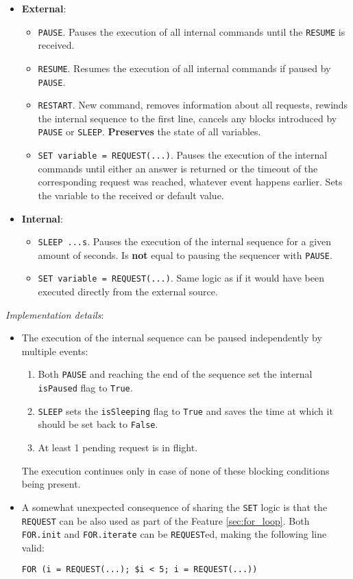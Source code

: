 \begin{itemize}
	\item \textbf{External}:
	\begin{itemize}
		\item \texttt{PAUSE}. Pauses the execution of all internal commands until the \texttt{RESUME} is received.
		\item \texttt{RESUME}. Resumes the execution of all internal commands if paused by \texttt{PAUSE}.
		\item \texttt{RESTART}. New command, removes information about all requests, rewinds the internal sequence to the first line, cancels any blocks introduced by \texttt{PAUSE} or \texttt{SLEEP}. \textbf{Preserves} the state of all variables.
		\item \texttt{SET variable = REQUEST(...)}. Pauses the execution of the internal commands until either an answer is returned or the timeout of the corresponding request was reached, whatever event happens earlier. Sets the variable to the received or default value.
	\end{itemize}
	\item \textbf{Internal}:
	\begin{itemize}
		\item \texttt{SLEEP ...s}. Pauses the execution of the internal sequence for a given amount of seconds. Is \textbf{not} equal to pausing the sequencer with \texttt{PAUSE}.
		\item \texttt{SET variable = REQUEST(...)}. Same logic as if it would have been executed directly from the external source.
	\end{itemize}
\end{itemize}

\newpage

\textit{Implementation details}:

\begin{itemize}
	\item{
		The execution of the internal sequence can be paused independently by multiple events:
		\begin{enumerate}
			\item Both \texttt{PAUSE} and reaching the end of the sequence set the internal \texttt{isPaused} flag to \texttt{True}.
			\item \texttt{SLEEP} sets the \texttt{isSleeping} flag to \texttt{True} and saves the time at which it should be set back to \texttt{False}.
			\item At least 1 pending request is in flight.
		\end{enumerate}
		The execution continues only in case of none of these blocking conditions being present.
	}
	\item{
		A somewhat unexpected consequence of sharing the \texttt{SET} logic is that the \texttt{REQUEST} can be also used as part of the Feature \ref{sec:for_loop}. Both \texttt{FOR.init} and \texttt{FOR.iterate} can be \texttt{REQUEST}ed, making the following line valid:
\begin{lstlisting}[language=n2EDMScript, numbers=none]
FOR (i = REQUEST(...); $i < 5; i = REQUEST(...))
\end{lstlisting}
	}
\end{itemize}

